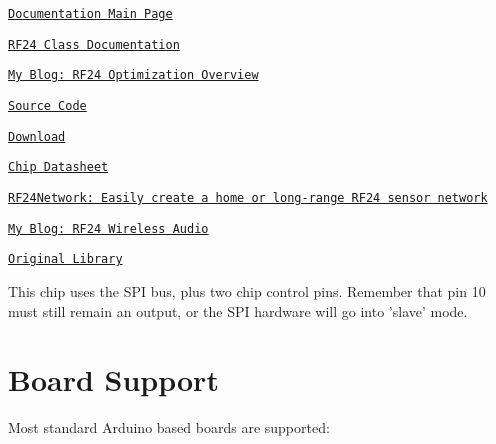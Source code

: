 \begin{DoxyItemize}
\item \href{http://tmrh20.github.io/}{\tt Documentation Main Page} \item \href{http://tmrh20.github.io/RF24/classRF24.html}{\tt R\+F24 Class Documentation} \item \href{http://tmrh20.blogspot.com/2014/03/high-speed-data-transfers-and-wireless.html}{\tt My Blog\+: R\+F24 Optimization Overview} \item \href{https://github.com/tmrh20/RF24/}{\tt Source Code} \item \href{https://github.com/TMRh20/RF24/archive/master.zip}{\tt Download} \item \href{http://www.nordicsemi.com/files/Product/data_sheet/nRF24L01_Product_Specification_v2_0.pdf}{\tt Chip Datasheet} \item \href{http://tmrh20.github.io/RF24Network/}{\tt R\+F24\+Network\+: Easily create a home or long-\/range R\+F24 sensor network} \item \href{http://tmrh20.blogspot.com/2014/03/arduino-radiointercomwireless-audio.html}{\tt My Blog\+: R\+F24 Wireless Audio} \item \href{https://github.com/maniacbug/RF24}{\tt Original Library}\end{DoxyItemize}
This chip uses the S\+P\+I bus, plus two chip control pins. Remember that pin 10 must still remain an output, or the S\+P\+I hardware will go into 'slave' mode.\hypertarget{index_Board_Support}{}\section{Board Support}\label{index_Board_Support}
Most standard Arduino based boards are supported\+:
